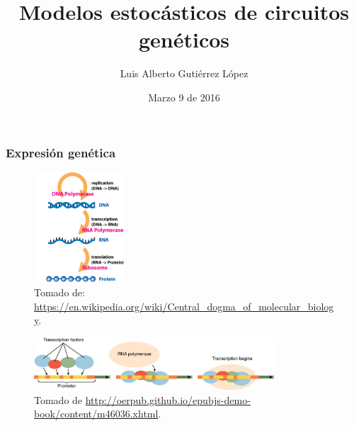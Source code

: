 \documentclass[10pt]{beamer}
\title[Modelos estoc\'asticos de circuitos gen\'eticos]{Modelos estoc\'asticos de circuitos gen\'eticos}
\author{Luis Alberto Guti\'errez L\'opez}
\institute[Uniandes]{Universidad de los Andes\\
Departamento de F\'isica\\
\medskip
}
\date{Marzo 9 de 2016}
\begin{document}
\begin{frame}
\titlepage
\end{frame}

\begin{frame}
\frametitle{Expresi\'on gen\'etica}

\begin{figure}[p]
    \centering
    \includegraphics[width=0.3\textwidth]{dogma.jpg}\\
    \tiny Tomado de: \url{https://en.wikipedia.org/wiki/Central_dogma_of_molecular_biology}.
\end{figure}

\begin{figure}[p]
    \centering
    \includegraphics[width=0.8\textwidth]{tf1.jpg}\\
    \tiny Tomado de \url{http://oerpub.github.io/epubjs-demo-book/content/m46036.xhtml}.
\end{figure}
\end{frame}
\end{document}
